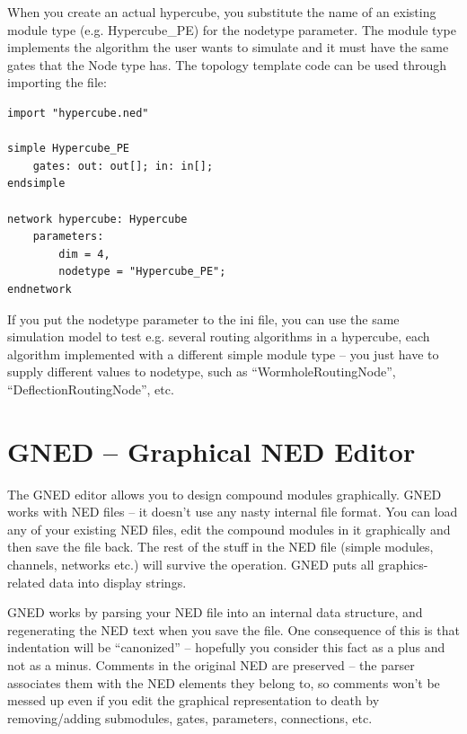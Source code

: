 When you create an actual hypercube, you substitute the name
of an existing module type (e.g. Hypercube\_PE) for the nodetype
parameter. The module type implements the algorithm the user
wants to simulate and it must have the same gates that the Node
type has. The topology template code can be used through importing
the file:


\begin{Verbatim}[commandchars=\\\{\}]
import "hypercube.ned"

simple Hypercube_PE
    gates: out: out[]; in: in[];
endsimple

network hypercube: Hypercube
    parameters:
        dim = 4,
        nodetype = "Hypercube_PE";
endnetwork
\end{Verbatim}



If you put the nodetype parameter to the ini file, you can use the
same simulation model to test e.g. several routing algorithms in a
hypercube, each algorithm implemented with a different
simple module type -- you just have to supply
different values to nodetype, such as ``WormholeRoutingNode'',
``DeflectionRoutingNode'', etc.






\section{GNED -- Graphical NED Editor}


The GNED editor allows you to design compound modules graphically.
GNED works with NED files -- it doesn't use any nasty internal file
format. You can load any of your existing NED files, edit the compound
modules in it graphically and then save the file back. The rest of the
stuff in the NED file (simple modules, channels, networks etc.) will
survive the operation. GNED puts all graphics-related data into
display strings.


GNED works by parsing your NED file into an internal data structure,
and regenerating the NED text when you save the file. One consequence
of this is that indentation will be ``canonized''
-- hopefully you consider this fact as a plus and not as a minus.
Comments in the original NED are preserved -- the parser associates
them with the NED elements they belong to, so comments won't
be messed up even if you edit the graphical representation to
death by removing/adding submodules, gates, parameters, connections,
etc.

